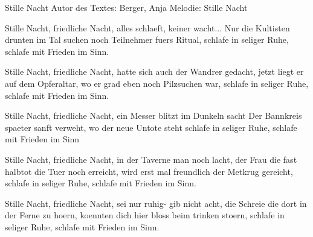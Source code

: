 Stille Nacht
Autor des Textes: Berger, Anja
Melodie: Stille Nacht


Stille Nacht, friedliche Nacht,
alles schlaeft, keiner wacht...
Nur die Kultisten drunten im Tal
suchen noch Teilnehmer fuers Ritual,
schlafe in seliger Ruhe,
schlafe mit Frieden im Sinn.

Stille Nacht, friedliche Nacht,
hatte sich auch der Wandrer gedacht,
jetzt liegt er auf dem Opferaltar,
wo er grad eben noch Pilzsuchen war,
schlafe in seliger Ruhe,
schlafe mit Frieden im Sinn.

Stille Nacht, friedliche Nacht,
ein Messer blitzt im Dunkeln sacht
Der Bannkreis spaeter sanft verweht,
wo der neue Untote steht
schlafe in seliger Ruhe,
schlafe mit Frieden im Sinn

Stille Nacht, friedliche Nacht,
in der Taverne man noch lacht,
der Frau die fast halbtot die Tuer noch erreicht,
wird erst mal freundlich der Metkrug gereicht,
schlafe in seliger Ruhe,
schlafe mit Frieden im Sinn.

Stille Nacht, friedliche Nacht,
sei nur ruhig- gib nicht acht,
die Schreie die dort in der Ferne zu hoern,
koennten dich hier bloss beim trinken stoern,
schlafe in seliger Ruhe,
schlafe mit Frieden im Sinn.

